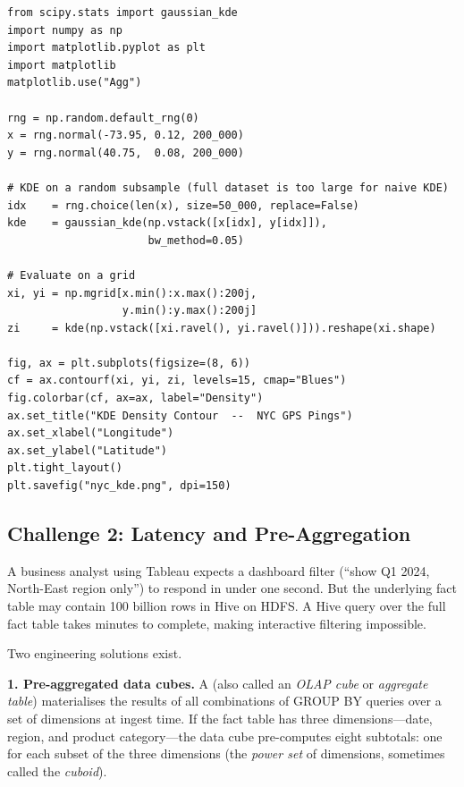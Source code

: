 \begin{lstlisting}[style=pyspark, caption={2-D KDE density plot (scipy + matplotlib)}]
from scipy.stats import gaussian_kde
import numpy as np
import matplotlib.pyplot as plt
import matplotlib
matplotlib.use("Agg")

rng = np.random.default_rng(0)
x = rng.normal(-73.95, 0.12, 200_000)
y = rng.normal(40.75,  0.08, 200_000)

# KDE on a random subsample (full dataset is too large for naive KDE)
idx    = rng.choice(len(x), size=50_000, replace=False)
kde    = gaussian_kde(np.vstack([x[idx], y[idx]]),
                      bw_method=0.05)

# Evaluate on a grid
xi, yi = np.mgrid[x.min():x.max():200j,
                  y.min():y.max():200j]
zi     = kde(np.vstack([xi.ravel(), yi.ravel()])).reshape(xi.shape)

fig, ax = plt.subplots(figsize=(8, 6))
cf = ax.contourf(xi, yi, zi, levels=15, cmap="Blues")
fig.colorbar(cf, ax=ax, label="Density")
ax.set_title("KDE Density Contour  --  NYC GPS Pings")
ax.set_xlabel("Longitude")
ax.set_ylabel("Latitude")
plt.tight_layout()
plt.savefig("nyc_kde.png", dpi=150)
\end{lstlisting}

\subsection{Challenge 2: Latency and Pre-Aggregation}
\label{subsec:latency}

A business analyst using Tableau expects a dashboard filter
(``show Q1 2024, North-East region only'') to respond in under one second.
But the underlying fact table may contain 100 billion rows in Hive on HDFS.
A Hive query over the full fact table takes minutes to complete, making
interactive filtering impossible.

Two engineering solutions exist.

\textbf{1. Pre-aggregated data cubes.} A  (also called
an \emph{OLAP cube} or \emph{aggregate table}) materialises the results
of all combinations of GROUP BY queries over a set of dimensions at
ingest time. If the fact table has three dimensions---date,
region, and product category---the data cube pre-computes eight
subtotals: one for each subset of the three dimensions (the
\emph{power set} of dimensions, sometimes called the \emph{cuboid}).

